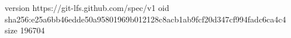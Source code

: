 version https://git-lfs.github.com/spec/v1
oid sha256:e25a6bb46edde50a95801969b012128c8acb1ab9fcf20d347cf994fadc6ca4c4
size 196704
